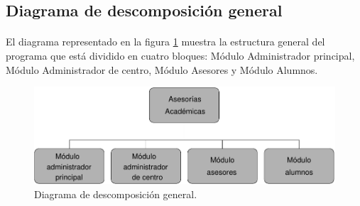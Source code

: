 \subsection{Diagrama de descomposición general}

  \paragraph{}El diagrama representado en la figura
  \ref{diagramaDescomposicionGeneral} muestra la estructura general del programa
  que está dividido en cuatro bloques: Módulo Administrador principal, Módulo
  Administrador de centro, Módulo Asesores y Módulo Alumnos.

  \begin{figure}[!ht]
    \begin{center}
      \includegraphics[]{11.Disenyo_Arquitectonico/11.2.Diagramas_Descomposicion/11.2.1.General/Diagramas/general.pdf}
      \caption{Diagrama de descomposición general.}
      \label{diagramaDescomposicionGeneral}
    \end{center}
  \end{figure}
